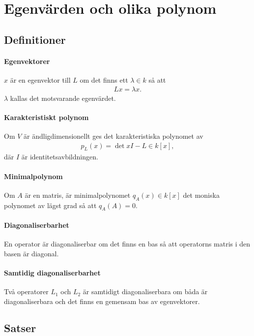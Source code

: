 \section{Egenvärden och olika polynom}

\subsection{Definitioner}

\paragraph{Egenvektorer}
$x$ är en egenvektor till $L$ om det finns ett $\lambda\in k$ så att
\begin{align*}
	Lx = \lambda x.
\end{align*}
$\lambda$ kallas det motsvarande egenvärdet.

\paragraph{Karakteristiskt polynom}
Om $V$ är ändligdimensionellt ges det karakteristiska polynomet av
\begin{align*}
	p_{L}(x) = \det{xI - L}\in k[x],
\end{align*}
där $I$ är identitetsavbildningen.

\paragraph{Minimalpolynom}
Om $A$ är en matris, är minimalpolynomet $q_{A}(x)\in k[x]$ det moniska polynomet av lägst grad så att $q_{A}(A) = 0$.

\paragraph{Diagonaliserbarhet}
En operator är diagonaliserbar om det finns en bas så att operatorns matris i den basen är diagonal.

\paragraph{Samtidig diagonaliserbarhet}
Två operatorer $L_{1}$ och $L_{2}$ är samtidigt diagonaliserbara om båda är diagonaliserbara och det finns en gemensam bas av egenvektorer.

\subsection{Satser}

